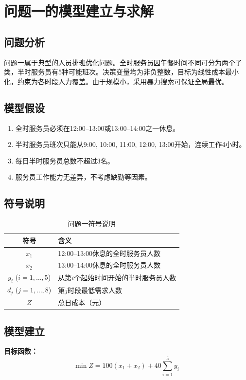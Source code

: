 \documentclass[12pt]{ctexart}
\begin{document}
\section{问题一的模型建立与求解}

\subsection{问题分析}
问题一属于典型的人员排班优化问题。全时服务员因午餐时间不同可分为两个子类，半时服务员有5种可能班次。决策变量均为非负整数，目标为线性成本最小化，约束为各时段人力覆盖。由于规模小，采用暴力搜索可保证全局最优。

\subsection{模型假设}
\begin{enumerate}[label=(\arabic*)]
    \item 全时服务员必须在12:00–13:00或13:00–14:00之一休息。
    \item 半时服务员班次只能从9:00, 10:00, 11:00, 12:00, 13:00开始，连续工作4小时。
    \item 每日半时服务员总数不超过3名。
    \item 服务员工作能力无差异，不考虑缺勤等因素。
\end{enumerate}

\subsection{符号说明}
\begin{table}[htbp]
    \centering
    \caption{问题一符号说明}
    \begin{tabular}{cl}
        \toprule
        符号 & 含义 \\
        \midrule
        $x_1$ & 12:00–13:00休息的全时服务员人数 \\
        $x_2$ & 13:00–14:00休息的全时服务员人数 \\
        $y_i$ ($i=1,\dots,5$) & 从第$i$个起始时间开始的半时服务员人数 \\
        $d_j$ ($j=1,\dots,8$) & 第$j$时段最低需求人数 \\
        $Z$ & 总日成本（元）\\
        \bottomrule
    \end{tabular}
\end{table}

\subsection{模型建立}
\textbf{目标函数：}
\[
\min Z = 100(x_1 + x_2) + 40\sum_{i=1}^{5} y_i
\]
\end{document}
